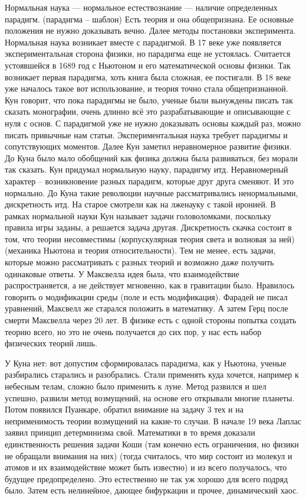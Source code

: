 \documentclass[a4paper, 12pt]{article}
\begin{document}
Нормальная наука --- нормальное естествознание --- наличие 
определенных парадигм. (парадигма -- шаблон) Есть теория и она 
общепризнана. Ее основные положения не нужно доказывать вечно. 
Далее методы постановки эксперимента. Нормальная наука возникает 
вместе с парадигмой. В 17 веке уже появляется экспериментальная 
сторона физики, но парадигма еще не устоялась. Считается 
устоявшейся в 1689 год с Ньютоном и его математической основы 
физики. Так возникает первая парадигма, хоть книга была сложная, ее 
постигали. В 18 веке уже началось такое вот использование, и теория 
точно стала общепризнанной. Кун говорит, что пока парадигмы не 
было, ученые были вынуждены писать так сказать монографии, очень 
длинно всё это разрабатывающие и описывающие с нуля с основ. 
С парадигмой уже не нужно доказывать основы каждый раз, можно 
писать привычные нам статьи. Экспериментальная наука требует 
парадигмы и сопутствующих моментов. Далее Кун заметил неравномерное 
развитие физики. До Куна было мало обобщений как физика должна была 
развиваться, без морали так сказать. Кун придумал нормальную науку, 
парадигму итд. Неравномерный характер -- возникновение разных 
парадигм, которые друг друга сменяют. И это нормально. До Куна 
такие революции научные рассматривались ненормальными, дискретность 
итд. На старое смотрели как на лженауку с такой иронией. В рамках 
нормальной науки Кун называет задачи головоломками, поскольку 
правила игры заданы, а решается задача другая. Дискретность скачка 
состоит в том, что теории несовместимы (корпускулярная теория света 
и волновая за ней) (механика Ньютона и теория относительности). Тем 
не менее, есть задачи, которые можно рассматривать с разных теорий 
и возможно даже получить одинаковые ответы. У Максвелла идея была, 
что взаимодействие распространяется, а не действует мгновенно, как 
в гравитации было. Нравилось говорить о модификации среды (поле 
и есть модификация). Фарадей не писал уравнений, Максвелл же 
старался положить в математику. А затем Герц после смерти Максвелла 
через 20 лет. В физике есть с одной стороны попытка создать теорию 
всего, но это не очень получается до сих пор, у нас есть набор 
физических теорий лишь.

У Куна нет: вот допустим сформировалась парадигма, как у Ньютона, 
ученые разбирались старались и разобрались. Стали применять куда 
хочется, например к небесным телам, сложно было применить к луне. 
Метод развился и шел успешно, развили метод возмущений, на основе 
его открывали многие планеты. Потом появился Пуанкаре, обратил 
внимание на задачу 3 тех и на неприменимость теории возмущений на 
какие-то случаи. В начале 19 века Лаплас заявил принцип 
детерминизма свой. Математики в то время доказали единственность 
решения задачи Коши (там конечно есть ограничения, но физики не 
обращали внимания на них) (тогда считалось, что мир состоит из 
молекул и атомов и их взаимодействие может быть известно) и из 
всего получалось, что будущее предопределено. Это естественно не 
так уж хорошо для всего подряд было. Затем есть нелинейное, дающее 
бифуркации и прочее, динамический хаос.
\end{document}
